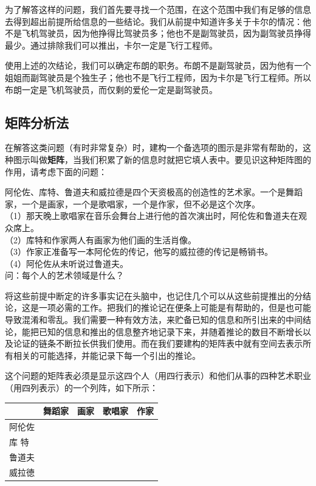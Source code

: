 为了解答这样的问题，我们首先要寻找一个范围，在这个范围中我们有足够的信息去得到超出前提所给信息的一些结论。我们从前提中知道许多关于卡尔的情况：他不是飞机驾驶员，因为他挣得比驾驶员多；他也不是副驾驶员，因为副驾驶员挣得最少。通过排除我们可以推出，卡尔一定是飞行工程师。

使用上述的次结论，我们可以确定布朗的职务。布朗不是副驾驶员，因为他有一个姐姐而副驾驶员是个独生子；他也不是飞行工程师，因为卡尔是飞行工程师。所以布朗一定是飞机驾驶员，而仅剩的爱伦一定是副驾驶员。

\subsection{矩阵分析法}

在解答这类问题（有时非常复杂）时，建构一个备选项的图示是非常有帮助的，这种图示叫做\textbf{矩阵}，当我们积累了新的信息时就把它填人表中。要见识这种矩阵图的作用，请考虑下面的问题：

\begin{displayquote}
阿伦佐、库特、鲁道夫和威拉德是四个天资极高的创造性的艺术家。一个是舞蹈家，一个是画家，一个是歌唱家，一个是作家，但不必是这个次序。\\
（1）那天晚上歌唱家在音乐会舞台上进行他的首次演出时，阿伦佐和鲁道夫在观众席上。\\
（2）库特和作家两人有画家为他们画的生活肖像。\\
（3）作家正准备写一本阿伦佐的传记，他写的威拉德的传记是畅销书。\\
（4）阿伦佐从未听说过鲁道夫。\\
问：每个人的艺术领域是什么？
\end{displayquote}

将这些前提中断定的许多事实记在头脑中，也记住几个可以从这些前提推出的分结论，这是一项必需的工作。把我们的推论记在便条上可能是有帮助的，但是也可能导致混淆和零乱。我们需要一种有效方法，来贮备已知的信息和所引出来的中间结论，能把已知的信息和推出的信息整齐地记录下来，并随着推论的数目不断增长以及论证的链条不断拉长供我们使用。而在我们要建构的矩阵表中就有空间去表示所有相关的可能选择，并能记录下每一个引出的推论。

这个问题的矩阵表必须是显示这四个人（用四行表示）和他们从事的四种艺术职业（用四列表示）的一个列阵，如下所示：

\begin{center}
\begin{tabular}{|l|l|l|l|l|}
\hline
 & 舞蹈家 & 画家 & 歌唱家 & 作家 \\
\hline
阿伦佐 &  &  &  &  \\
\hline
库 特 &  &  &  &  \\
\hline
鲁道夫 &  &  &  &  \\
\hline
威拉徳 &  &  &  &  \\
\hline
\end{tabular}
\end{center}

